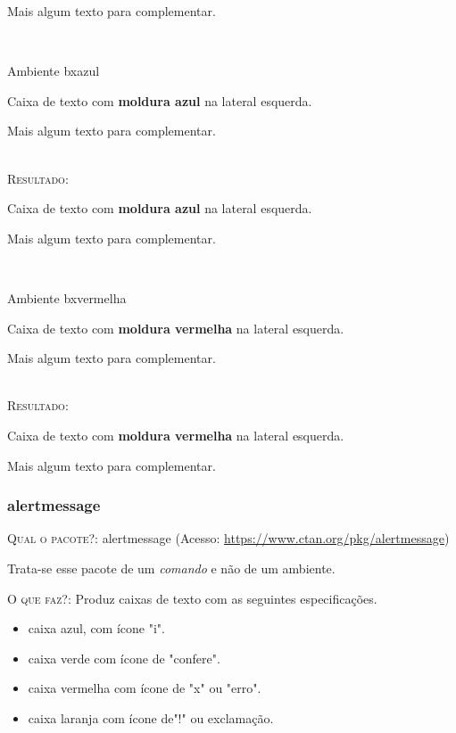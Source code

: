 \documentclass[a4paper,12pt,oneside,openright,extrafontsizes,openbib]{memoir}
\begin{document}
{\begin{bxcinza}
	Mais algum texto para complementar.  
\end{bxcinza}
\ \\

\begin{codex}{Ambiente bxazul}
	\begin{bxazul}
	Caixa de texto com \textbf{moldura azul} na lateral esquerda. 
	
	Mais algum texto para complementar.  
	\end{bxazul}
\end{codex}
\ \\

 \textsc{Resultado:}
 \ \\
 
\begin{bxazul}
	Caixa de texto com \textbf{moldura azul} na lateral esquerda. 
	
	Mais algum texto para complementar.  
\end{bxazul}
\ \\

\begin{codex}{Ambiente bxvermelha}
	\begin{bxvermelha}
	Caixa de texto com \textbf{moldura vermelha} na lateral esquerda. 
		
	Mais algum texto para complementar.  
	\end{bxvermelha}
\end{codex}
\ \\

\textsc{Resultado:}
\ \\

\begin{bxvermelha}
	Caixa de texto com \textbf{moldura vermelha} na lateral esquerda. 
	
	Mais algum texto para complementar.  
\end{bxvermelha}


\subsubsection{alertmessage}

\textsc{Qual o pacote?}: alertmessage (Acesso: \url{https://www.ctan.org/pkg/alertmessage})

Trata-se esse pacote de um \textit{comando} e não de um ambiente.

\textsc{O que faz?}: Produz caixas de texto com as seguintes especificações.

\begin{itemize}
\item caixa azul, com ícone "i".
\item caixa verde com ícone de "confere".
\item caixa vermelha com ícone de "x" ou "erro".
\item caixa laranja com ícone de"!" ou exclamação.
\end{itemize}
\ \\

}
\end{document}
